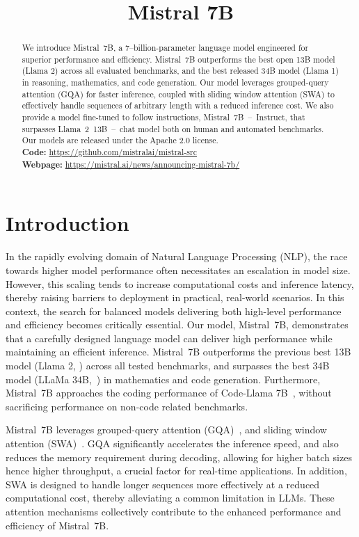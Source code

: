 \title{Mistral 7B}

\begin{abstract}
We introduce Mistral~7B, a 7--billion-parameter language model engineered for superior performance and efficiency. Mistral~7B outperforms the best open 13B model (Llama 2) across all evaluated benchmarks, and the best released 34B model (Llama 1) in reasoning, mathematics, and code generation. Our model leverages grouped-query attention (GQA) for faster inference, coupled with sliding window attention (SWA) to effectively handle sequences of arbitrary length with a reduced inference cost. We also provide a model fine-tuned to follow instructions, Mistral~7B~--~Instruct, that surpasses Llama~2~13B~--~chat model both on human and automated benchmarks. Our models are released under the Apache 2.0 license.\\
\textbf{Code:} \url{https://github.com/mistralai/mistral-src} \\
\textbf{Webpage:} \url{https://mistral.ai/news/announcing-mistral-7b/}
\end{abstract}

\section{Introduction}

 In the rapidly evolving domain of Natural Language Processing (NLP), the race towards higher model performance often necessitates an escalation in model size. However, this scaling tends to increase computational costs and inference latency, thereby raising barriers to deployment in practical, real-world scenarios. In this context, the search for balanced models delivering both high-level performance and efficiency becomes critically essential. Our model, Mistral~7B, demonstrates that a carefully designed language model can deliver high performance while maintaining an efficient inference. Mistral~7B outperforms the previous best 13B model (Llama 2, \cite{touvron2023llama2}) across all tested benchmarks, and surpasses the best 34B model (LLaMa 34B,~\cite{touvron2023llama}) in mathematics and code generation. Furthermore, Mistral~7B approaches the coding performance of Code-Llama 7B~\cite{roziere2023code}, without sacrificing performance on non-code related benchmarks.

Mistral~7B leverages grouped-query attention (GQA)~\cite{ainslie2023gqa}, and sliding window attention (SWA)~\cite{child2019generating,beltagy2020longformer}. GQA significantly accelerates the inference speed, and also reduces the memory requirement during decoding, allowing for higher batch sizes hence higher throughput, a crucial factor for real-time applications. In addition, SWA is designed to handle longer sequences more effectively at a reduced computational cost, thereby alleviating a common limitation in LLMs. These attention mechanisms collectively contribute to the enhanced performance and efficiency of Mistral~7B.

